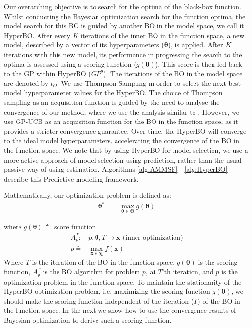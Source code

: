Our overarching objective is to search for the optima of the black-box function. Whilst conducting the Bayesian optimization search for the function optima, the model search for this BO is  guided by another BO in the model space, we call it HyperBO. After every $K$ iterations of the inner BO in the function space, a new model, described by a vector of its hyperparameters ($\boldsymbol{\theta}$), is applied. After $K$ iterations with this new model, its performance in progressing the search to the optima is assessed using a scoring function ($g(\boldsymbol{\theta})$). This score is then fed back to the GP within HyperBO ($GP^{\theta}$). The iterations of the BO in the model space are denoted by $t_O$. We use Thompson Sampling in order to select the next best model hyperparameter values for the HyperBO. The choice of Thompson sampling as an acquisition function is guided by the need to analyse the convergence of our method, where we use the analysis similar to \cite{Basu2017}. However, we use GP-UCB as an acquisition function for the BO in the function space, as it provides a stricter convergence guarantee. Over time, the HyperBO will converge to the ideal model hyperparameters, accelerating the convergence of the BO in the function space. We note that by using HyperBO for model selection, we use a more active approach of model selection using prediction, rather than the usual passive way of using estimation. Algorithms \ref{alg:AMMSF} - \ref{alg:HyperBO} describe this Predictive modeling framework.

Mathematically, our optimization problem is defined as:
\begin{align*}
\boldsymbol{\theta}^{*} = & \operatorname*{max}_{\boldsymbol{\theta}\in \boldsymbol{\Theta}} g(\boldsymbol{\theta})
\end{align*}

where $g(\boldsymbol{\theta}) \triangleq$ score function
\begin{align*}
A_{p}^{T} : & p, \boldsymbol{\theta}, T \rightarrow \boldsymbol{x} \text{ (inner optimization)}\\
p \triangleq & \operatorname*{max}_{\boldsymbol{x}\in \boldsymbol{\chi}} f(\boldsymbol{x})
\end{align*}
Where $T$ is the iteration of the BO in the function space, $g(\boldsymbol{\theta})$ is the scoring function, $A_{p}^{T}$ is the BO algorithm for problem $p$, at $T$'th iteration, and $p$ is the optimization problem in the function space. To maintain the stationarity of the HyperBO optimization problem, i.e. maximizing the scoring function $g(\boldsymbol{\theta})$, we should make the scoring function independent of the iteration ($T$) of the BO in the function space. In the next we show how to use the convergence results of Bayesian optimization to derive such a scoring function.

